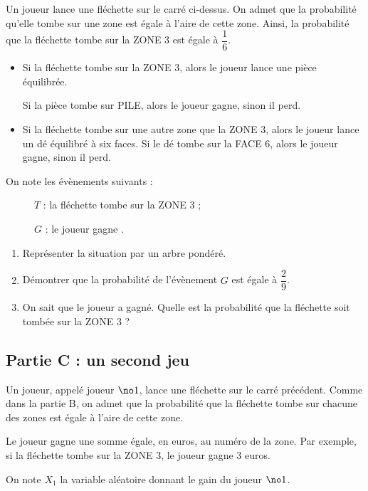Un joueur lance une fléchette sur le carré ci-dessus. On admet que la probabilité qu'elle tombe sur une zone est égale à l'aire de cette zone. Ainsi, la probabilité que la fléchette tombe sur la ZONE 3 est égale à $\dfrac{1}{6}$.

\begin{itemize}[label=$\bullet~~$]
\item Si la fléchette tombe sur la ZONE 3, alors le joueur lance une pièce équilibrée.

Si la pièce tombe sur PILE, alors le joueur gagne, sinon il perd.
\item Si la fléchette tombe sur une autre zone que la ZONE 3, alors le joueur lance un dé équilibré à six faces. Si le dé tombe sur la FACE 6, alors le joueur gagne, sinon il perd.
\end{itemize}

\medskip

On note les évènements suivants :

\begin{description}
\item[ ] $T$ : \og la fléchette tombe sur la ZONE 3 \fg{} ;
\item[ ] $G$ : \og le joueur gagne \fg.
\end{description}

\medskip

\begin{enumerate}
\item Représenter la situation par un arbre pondéré.
\item Démontrer que la probabilité de l'évènement $G$ est égale à $\dfrac{2}{9}$.
\item On sait que le joueur a gagné. Quelle est la probabilité que la fléchette soit tombée sur la ZONE 3 ?
\end{enumerate}

\subsection*{Partie C : un second jeu}

Un joueur, appelé joueur $\no 1$, lance une fléchette sur le carré précédent. Comme dans la partie B, on admet que la probabilité que la fléchette tombe sur chacune des zones est égale à l'aire de cette zone.

Le joueur gagne une somme égale, en euros, au numéro de la zone. Par exemple, si la fléchette tombe sur la ZONE 3, le joueur gagne 3 euros.

On note $X_{1}$ la variable aléatoire donnant le gain du joueur $\no 1$.

